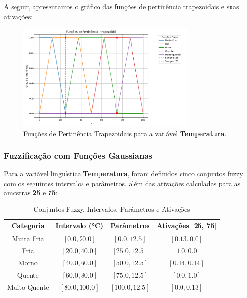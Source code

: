 \documentclass[a4paper,12pt]{article}
\begin{document}
A seguir, apresentamos o gráfico das funções de pertinência trapezoidais e suas ativações:

\begin{figure}[H]
    \centering
    \includegraphics[width=0.8\textwidth]{img/funções_de_pertinência_trapezoidal_fuzzificado.png}
    \caption{Funções de Pertinência Trapezoidais para a variável \textbf{Temperatura}.}
\end{figure}


\subsubsection{Fuzzificação com Funções Gaussianas}

Para a variável linguística \textbf{Temperatura}, foram definidos cinco conjuntos fuzzy com os seguintes intervalos e parâmetros, além das ativações calculadas para as amostras \textbf{25} e \textbf{75}:

\begin{table}[H]
\centering
\caption{Conjuntos Fuzzy, Intervalos, Parâmetros e Ativações}
\begin{tabular}{|c|c|c|c|}
\hline
\textbf{Categoria}    & \textbf{Intervalo (°C)} & \textbf{Parâmetros}       & \textbf{Ativações [25, 75]} \\ \hline
Muita Fria            & $[0.0, 20.0]$          & $[0.0, 12.5]$             & $[0.13, 0.0]$              \\ \hline
Fria                  & $[20.0, 40.0]$         & $[25.0, 12.5]$            & $[1.0, 0.0]$               \\ \hline
Morno                 & $[40.0, 60.0]$         & $[50.0, 12.5]$            & $[0.14, 0.14]$             \\ \hline
Quente                & $[60.0, 80.0]$         & $[75.0, 12.5]$            & $[0.0, 1.0]$               \\ \hline
Muito Quente          & $[80.0, 100.0]$        & $[100.0, 12.5]$           & $[0.0, 0.13]$              \\ \hline
\end{tabular}
\end{table}
\end{document}
